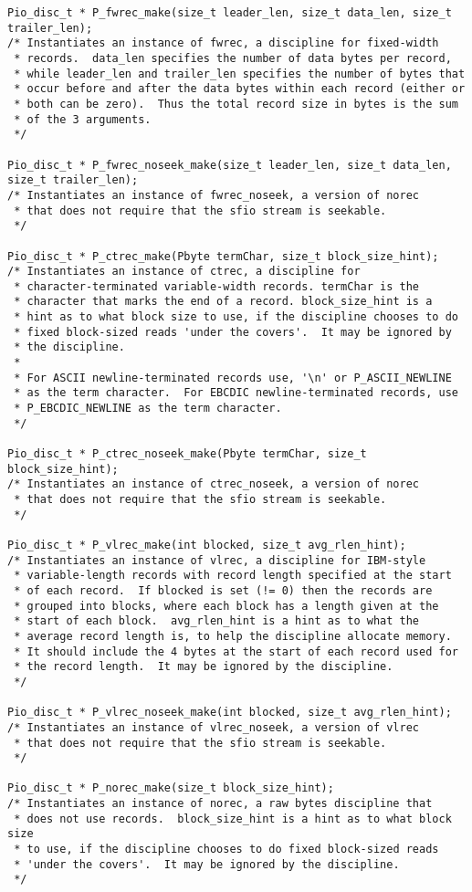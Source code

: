 \begin{verbatim}
Pio_disc_t * P_fwrec_make(size_t leader_len, size_t data_len, size_t trailer_len);
/* Instantiates an instance of fwrec, a discipline for fixed-width
 * records.  data_len specifies the number of data bytes per record,
 * while leader_len and trailer_len specifies the number of bytes that
 * occur before and after the data bytes within each record (either or
 * both can be zero).  Thus the total record size in bytes is the sum
 * of the 3 arguments.  
 */

Pio_disc_t * P_fwrec_noseek_make(size_t leader_len, size_t data_len, size_t trailer_len);
/* Instantiates an instance of fwrec_noseek, a version of norec
 * that does not require that the sfio stream is seekable.
 */

Pio_disc_t * P_ctrec_make(Pbyte termChar, size_t block_size_hint);
/* Instantiates an instance of ctrec, a discipline for
 * character-terminated variable-width records. termChar is the
 * character that marks the end of a record. block_size_hint is a
 * hint as to what block size to use, if the discipline chooses to do
 * fixed block-sized reads 'under the covers'.  It may be ignored by
 * the discipline.
 * 
 * For ASCII newline-terminated records use, '\n' or P_ASCII_NEWLINE
 * as the term character.  For EBCDIC newline-terminated records, use
 * P_EBCDIC_NEWLINE as the term character.
 */

Pio_disc_t * P_ctrec_noseek_make(Pbyte termChar, size_t block_size_hint);
/* Instantiates an instance of ctrec_noseek, a version of norec
 * that does not require that the sfio stream is seekable.
 */

Pio_disc_t * P_vlrec_make(int blocked, size_t avg_rlen_hint);
/* Instantiates an instance of vlrec, a discipline for IBM-style
 * variable-length records with record length specified at the start
 * of each record.  If blocked is set (!= 0) then the records are
 * grouped into blocks, where each block has a length given at the
 * start of each block.  avg_rlen_hint is a hint as to what the
 * average record length is, to help the discipline allocate memory.
 * It should include the 4 bytes at the start of each record used for
 * the record length.  It may be ignored by the discipline.
 */

Pio_disc_t * P_vlrec_noseek_make(int blocked, size_t avg_rlen_hint);
/* Instantiates an instance of vlrec_noseek, a version of vlrec
 * that does not require that the sfio stream is seekable.
 */

Pio_disc_t * P_norec_make(size_t block_size_hint);
/* Instantiates an instance of norec, a raw bytes discipline that
 * does not use records.  block_size_hint is a hint as to what block size
 * to use, if the discipline chooses to do fixed block-sized reads
 * 'under the covers'.  It may be ignored by the discipline.
 */


\end{verbatim}
